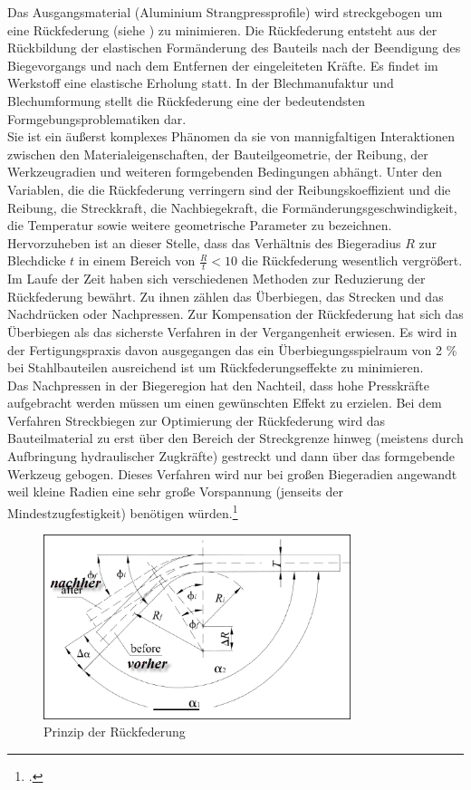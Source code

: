 \documentclass[12pt,a4paper,parskip]{scrartcl}
\begin{document}
Das Ausgangsmaterial (Aluminium Strangpressprofile) wird streckgebogen um eine Rückfederung (siehe ) zu minimieren.  Die Rückfederung entsteht aus der Rückbildung der elastischen Formänderung des Bauteils nach der Beendigung des Biegevorgangs und nach dem Entfernen der eingeleiteten Kräfte. Es findet im Werkstoff eine elastische Erholung statt. In der Blechmanufaktur und Blechumformung stellt die Rückfederung eine der bedeutendsten Formgebungsproblematiken dar.
\\
 Sie ist ein äußerst komplexes Phänomen da sie von mannigfaltigen Interaktionen zwischen den Materialeigenschaften, der Bauteilgeometrie, der Reibung,  der Werkzeugradien und weiteren formgebenden Bedingungen abhängt. Unter den Variablen, die die Rückfederung verringern sind der Reibungskoeffizient und die Reibung, die Streckkraft, die Nachbiegekraft, die Formänderungsgeschwindigkeit, die Temperatur sowie weitere geometrische Parameter zu bezeichnen. Hervorzuheben ist an dieser Stelle, dass das Verhältnis des Biegeradius $ R $ zur Blechdicke $ t $ in einem Bereich von $ \frac{R}{t} < 10 $ die Rückfederung wesentlich vergrößert. Im Laufe der Zeit haben sich verschiedenen Methoden zur Reduzierung der Rückfederung bewährt. Zu ihnen zählen das Überbiegen, das Strecken und das Nachdrücken oder Nachpressen. Zur Kompensation der Rückfederung hat sich das Überbiegen als das sicherste Verfahren in der Vergangenheit erwiesen. Es wird in der Fertigungspraxis davon ausgegangen das ein Überbiegungsspielraum von 2 \%  bei Stahlbauteilen ausreichend ist um Rückfederungseffekte zu minimieren.\\ Das Nachpressen in der Biegeregion hat den Nachteil, dass hohe Presskräfte aufgebracht werden müssen um einen gewünschten Effekt zu erzielen. Bei dem Verfahren  Streckbiegen zur Optimierung der Rückfederung wird das Bauteilmaterial zu erst über den Bereich der Streckgrenze hinweg (meistens durch Aufbringung hydraulischer Zugkräfte) gestreckt und dann über das formgebende Werkzeug gebogen. Dieses Verfahren wird nur bei großen Biegeradien angewandt weil kleine Radien eine sehr große Vorspannung (jenseits der Mindestzugfestigkeit) benötigen würden.\footcite[Vgl.][16-19]{hmp}\\  
 
 \begin{figure}[hbtp]
 \centering
 \includegraphics[width=0.8\textwidth]{springback}
 \caption[Rückfederung]{Prinzip der Rückfederung\protect\footnotemark}
 \label{fig:springback}
 \end{figure}
 
\end{document}

